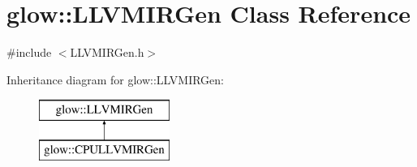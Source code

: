 \hypertarget{classglow_1_1_l_l_v_m_i_r_gen}{}\section{glow\+:\+:L\+L\+V\+M\+I\+R\+Gen Class Reference}
\label{classglow_1_1_l_l_v_m_i_r_gen}


{\ttfamily \#include $<$L\+L\+V\+M\+I\+R\+Gen.\+h$>$}

Inheritance diagram for glow\+:\+:L\+L\+V\+M\+I\+R\+Gen\+:\begin{figure}[H]
\begin{center}
\leavevmode
\includegraphics[height=2.000000cm]{classglow_1_1_l_l_v_m_i_r_gen}
\end{center}
\end{figure}
